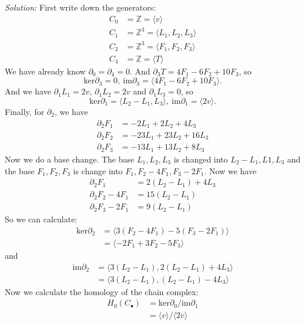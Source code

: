 \documentclass[a4paper, 11pt]{article}
\newenvironment{solution}
    {\textit{Solution:}}
    {}
\begin{document}
\begin{solution}
First write down the generators:
\begin{align*}
    C_0 & =\mathbb{Z}  =\langle v\rangle \\ 
    C_1 & =\mathbb{Z}^3  =\langle L_1,L_2,L_3\rangle\\ 
    C_2 & =\mathbb{Z}^3  =\langle F_1,F_2,F_3\rangle\\
    C_4 & =\mathbb{Z}  =\langle T\rangle  
\end{align*}
We have already know \(\partial_0=\partial_4=0\). And \(\partial_3 T=4F_1-6F_2+10F_3\), so 
$$\text{ker}\partial_3=0,\ \text{im}\partial_3=\langle 4F_1-6F_2+10F_3\rangle.$$
And we have \(\partial_1 L_1=2v\), \(\partial_1 L_2=2v\) and \(\partial_1 L_3=0\), so 
$$\text{ker}\partial_1=\langle L_2-L_1, L_3\rangle,\ \text{im}\partial_1=\langle 2v\rangle.$$
Finally, for \(\partial_2\), we have 
\begin{align*}
    \partial_2 F_1 & =-2L_1+2L_2+4L_3\\ 
    \partial_2 F_2 & =-23L_1+23L_2+16L_3\\ 
    \partial_2 F_3 & =-13L_1+13L_2+8L_3
\end{align*}
Now we do a base change. The base \(L_1,L_2,L_3\) is changed into \(L_2-L_1,L1,L_3\) and the base \(F_1,F_2,F_3\) is change into \(F_1,F_2-4F_1,F_3-2F_1\). Now 
we have 
\begin{align*}
    \partial_2 F_1 & =2(L_2-L_1)+4L_3\\ 
    \partial_2 F_2-4F_1 & =15(L_2-L_1)\\ 
    \partial_2 F_3-2F_1 & =9(L_2-L_1)
\end{align*}
So we can calculate:
\begin{align*}
    \text{ker}\partial_2 & =\langle 3(F_2-4F_1)-5(F_3-2F_1)\rangle\\ 
                         & =\langle -2F_1+3F_2-5F_3\rangle 
\end{align*}
and 
\begin{align*}
    \text{im}\partial_2 & = \langle 3(L_2-L_1), 2(L_2-L_1)+4L_3\rangle\\ 
                        & = \langle 3(L_2-L_1), (L_2-L_1)-4L_3\rangle
\end{align*}
Now we calculate the homology of the chain complex:
\begin{align*}
    H_0(C_\bullet) & = \text{ker}{\partial_0}/\text{im}\partial_1\\ 
                   & = \langle v \rangle/\langle 2v\rangle\\ 

\end{align*}
\end{solution}
\end{document}
